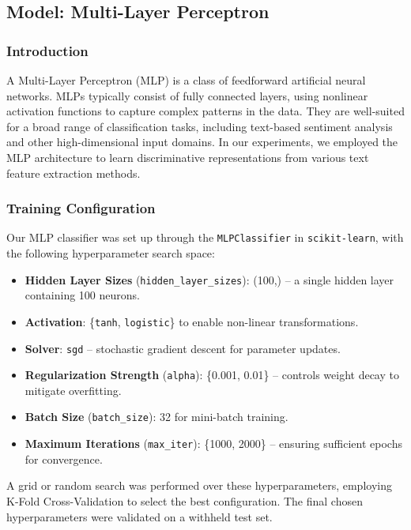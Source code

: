 \subsection{Model: Multi-Layer Perceptron}

\subsubsection{Introduction}

A Multi-Layer Perceptron (MLP) is a class of feedforward artificial neural networks. MLPs typically consist of fully connected layers, using nonlinear activation functions to capture complex patterns in the data. They are well-suited for a broad range of classification tasks, including text-based sentiment analysis and other high-dimensional input domains. In our experiments, we employed the MLP architecture to learn discriminative representations from various text feature extraction methods.

\subsubsection{Training Configuration}

Our MLP classifier was set up through the \texttt{MLPClassifier} in \texttt{scikit-learn}, with the following hyperparameter search space:
\begin{itemize}
    \item \textbf{Hidden Layer Sizes} (\texttt{hidden\_layer\_sizes}): (100,) – a single hidden layer containing 100 neurons.
    \item \textbf{Activation}: \{\texttt{tanh}, \texttt{logistic}\} to enable non-linear transformations.
    \item \textbf{Solver}: \texttt{sgd} – stochastic gradient descent for parameter updates.
    \item \textbf{Regularization Strength} (\texttt{alpha}): \{0.001, 0.01\} – controls weight decay to mitigate overfitting.
    \item \textbf{Batch Size} (\texttt{batch\_size}): 32 for mini-batch training.
    \item \textbf{Maximum Iterations} (\texttt{max\_iter}): \{1000, 2000\} – ensuring sufficient epochs for convergence.
\end{itemize}

A grid or random search was performed over these hyperparameters, employing K-Fold Cross-Validation to select the best configuration. The final chosen hyperparameters were validated on a withheld test set.

